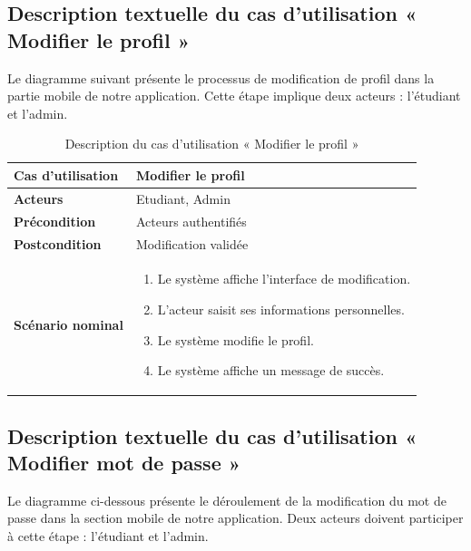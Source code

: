 \begin{sloppypar}
\vspace{-1cm}
\subsection{Description textuelle du cas d’utilisation « Modifier le profil »}
\vspace{-4mm}
Le diagramme suivant présente le processus de modification de profil dans la partie mobile de notre application. Cette étape implique deux acteurs : l'étudiant et l'admin.
\begin{table}[h]
\centering
\begin{tabular}{|p{3cm}|p{12cm}|}
\hline
\textbf{Cas d'utilisation } & Modifier le profil  \\
\hline
\textbf{Acteurs} & Etudiant, Admin \\
\hline
\textbf{Précondition} & Acteurs authentifiés \\
\hline
\textbf{Postcondition} & Modification validée \\
\hline
\textbf{Scénario nominal} &
\begin{enumerate}
    \item Le système affiche l’interface de modification.
    \item L’acteur saisit ses informations personnelles.
    \item Le système modifie le profil.
    \item Le système affiche un message de succès.
\end{enumerate} \\
\hline
\end{tabular}
\caption{Description du cas d’utilisation « Modifier le profil »}
\end{table}


\vspace{0cm}
\subsection{Description textuelle du cas d’utilisation « Modifier mot de passe »}
\vspace{-4mm}
Le diagramme ci-dessous présente le déroulement de la modification du mot de passe dans la section mobile de notre application. Deux acteurs doivent participer à cette étape : l'étudiant et l'admin.


\end{sloppypar}
